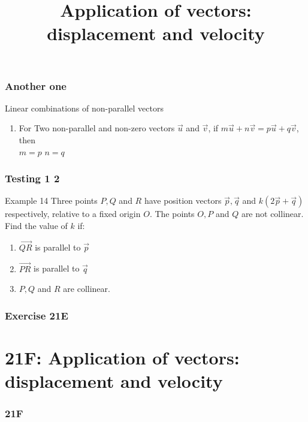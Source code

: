 \documentclass[
	11pt, %
]{beamer}
\newcommand{\blank}{\begin{frame}\end{frame}}
\begin{document}
\begin{frame}
    \frametitle{Another one}
    \begin{block}{Linear combinations of non-parallel vectors}
        \begin{enumerate}
            \item For Two non-parallel and non-zero vectors $\vec{u}$ and $\vec{v}$, if  $m\vec{u} + n\vec{v} = p\vec{u} + q\vec{v}$, then\\
            \centering
            $m = p$ \qquad $n = q$
        \end{enumerate}
    \end{block}
\end{frame}

\begin{frame}[t]
    \frametitle{Testing 1 2}
    \begin{block}{Example 14}
        Three points $P, Q$ and $R$ have position vectors $\vec{p}, \vec{q}$ and $k(2\vec{p} + \vec{q})$ respectively, relative to a 
        fixed origin $O$. The points $O, P$ and $Q$ are not collinear. Find the value of $k$ if:\\
        \begin{enumerate}
            \item $\vec{QR}$ is parallel to $\vec{p}$
            \item $\vec{PR}$ is parallel to $\vec{q}$
            \item $P, Q$ and $R$ are collinear.
        \end{enumerate}
    \end{block}
\end{frame}
\blank

\begin{frame}
    \frametitle{Exercise 21E}
\end{frame}


\section{21F: Application of vectors: displacement and velocity}
\begin{frame}
    \frametitle{21F}
    \begin{center}
        \title{Application of vectors: displacement and velocity}
        \maketitle
    \end{center}
\end{frame}
\end{document}

